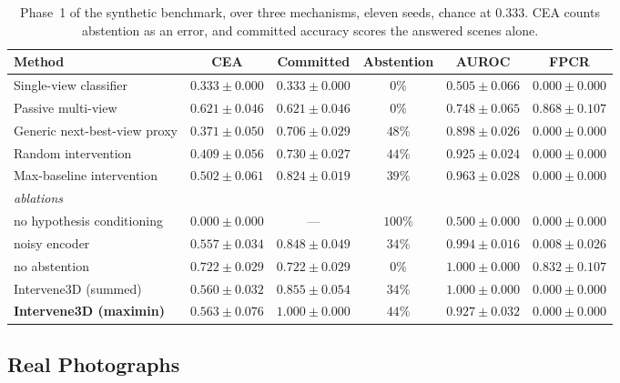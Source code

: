 \documentclass{article} %
\theoremstyle{defstyle}
\theoremstyle{plain}
\begin{document}
\begin{table}[t]
\caption{Phase~1 of the synthetic benchmark, over three mechanisms, eleven seeds, chance at $0.333$. CEA counts abstention as an error, and committed accuracy scores the answered scenes alone.}
\label{tab:phase1}
\begin{center}
\footnotesize \setlength{\tabcolsep}{1.6pt}
\begin{tabular}{lccccc}
\toprule
\textbf{Method} & \textbf{CEA} & \textbf{Committed} & \textbf{Abstention} &
\textbf{AUROC} & \textbf{FPCR} \\
\midrule
Single-view classifier    & $0.333{\pm}0.000$ & $0.333{\pm}0.000$ & $0\%$  & $0.505{\pm}0.066$ & $0.000{\pm}0.000$ \\
Passive multi-view        & $0.621{\pm}0.046$ & $0.621{\pm}0.046$ & $0\%$  & $0.748{\pm}0.065$ & $0.868{\pm}0.107$ \\
Generic next-best-view proxy & $0.371{\pm}0.050$ & $0.706{\pm}0.029$ & $48\%$ & $0.898{\pm}0.026$ & $0.000{\pm}0.000$ \\
Random intervention       & $0.409{\pm}0.056$ & $0.730{\pm}0.027$ & $44\%$ & $0.925{\pm}0.024$ & $0.000{\pm}0.000$ \\
Max-baseline intervention & $0.502{\pm}0.061$ & $0.824{\pm}0.019$ & $39\%$ & $0.963{\pm}0.028$ & $0.000{\pm}0.000$ \\
\midrule
\multicolumn{6}{l}{\emph{ablations}} \\
no hypothesis conditioning & $0.000{\pm}0.000$ & --- & $100\%$ & $0.500{\pm}0.000$ & $0.000{\pm}0.000$ \\
noisy encoder & $0.557{\pm}0.034$ & $0.848{\pm}0.049$ & $34\%$ & $0.994{\pm}0.016$ & $0.008{\pm}0.026$ \\
no abstention & $\mathbf{0.722{\pm}0.029}$ & $0.722{\pm}0.029$ & $0\%$ & $1.000{\pm}0.000$ & $0.832{\pm}0.107$ \\
\midrule
Intervene3D (summed) & $0.560{\pm}0.032$ & $0.855{\pm}0.054$ & $34\%$ & $1.000{\pm}0.000$ & $0.000{\pm}0.000$ \\
\textbf{Intervene3D (maximin)} & $0.563{\pm}0.076$ & $\mathbf{1.000{\pm}0.000}$ & $44\%$ & $0.927{\pm}0.032$ & $\mathbf{0.000{\pm}0.000}$ \\
\bottomrule
\end{tabular}
\end{center}
\end{table}

\subsection{Real Photographs}
\label{sec:res-universal}
\end{document}
